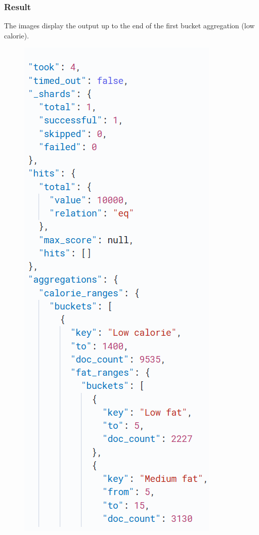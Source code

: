 \begin{enumerate}
    \subsubsection{Result}
    The images display the output up to the end of the first bucket aggregation (low calorie).

    \begin{figure}[h!]
    \centering
    \begin{minipage}{0.25\textwidth}
        \centering
        \includegraphics[width=\textwidth]{Report/ReportLatex/Images/ElasticsearchResults/calories1.png}

\end{minipage}
\end{figure}
\end{enumerate}
